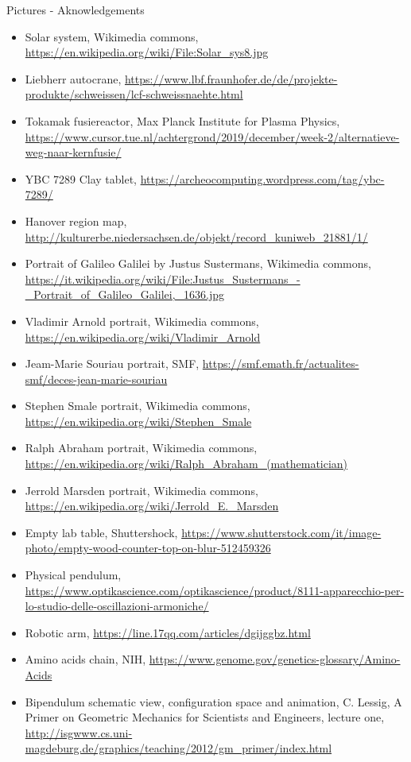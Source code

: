 \documentclass[beamer,10pt]{standalone}
\begin{document}
\begin{frame}[t,allowframebreaks]{Pictures - Aknowledgements}
	\begin{itemize}
		
		\item Solar system, Wikimedia commons,
			\url{https://en.wikipedia.org/wiki/File:Solar_sys8.jpg}
		\item Liebherr autocrane,
			\url{https://www.lbf.fraunhofer.de/de/projekte-produkte/schweissen/lcf-schweissnaehte.html}
		\item Tokamak fusiereactor, Max Planck Institute for Plasma Physics,
			\url{https://www.cursor.tue.nl/achtergrond/2019/december/week-2/alternatieve-weg-naar-kernfusie/} 	
	
		\item YBC 7289 Clay tablet, 
			\url{https://archeocomputing.wordpress.com/tag/ybc-7289/}
		\item Hanover region map,
			\url{http://kulturerbe.niedersachsen.de/objekt/record_kuniweb_21881/1/}
		\item Portrait of Galileo Galilei by Justus Sustermans, Wikimedia commons,
			\url{https://it.wikipedia.org/wiki/File:Justus_Sustermans_-_Portrait_of_Galileo_Galilei,_1636.jpg}
		\item Vladimir Arnold portrait, Wikimedia commons,
			\url{https://en.wikipedia.org/wiki/Vladimir_Arnold}
		\item Jeam-Marie Souriau portrait, SMF, 
			\url{https://smf.emath.fr/actualites-smf/deces-jean-marie-souriau}
		\item Stephen Smale portrait, Wikimedia commons,
			\url{https://en.wikipedia.org/wiki/Stephen_Smale}
		\item Ralph Abraham portrait, Wikimedia commons, 
			\url{https://en.wikipedia.org/wiki/Ralph_Abraham_(mathematician)}
		\item Jerrold Marsden portrait, Wikimedia commons,
			\url{https://en.wikipedia.org/wiki/Jerrold_E._Marsden}
	
		\item Empty lab table, Shuttershock,
			\url{https://www.shutterstock.com/it/image-photo/empty-wood-counter-top-on-blur-512459326}
		\item Physical pendulum,
			\url{https://www.optikascience.com/optikascience/product/8111-apparecchio-per-lo-studio-delle-oscillazioni-armoniche/}
		\item Robotic arm,
			\url{https://line.17qq.com/articles/dgijggbz.html}
		\item Amino acids chain, NIH, 
			\url{https://www.genome.gov/genetics-glossary/Amino-Acids}
		\item Bipendulum schematic view, configuration space and animation, C. Lessig, A Primer on Geometric Mechanics for Scientists and Engineers, lecture one, 
			\url{http://isgwww.cs.uni-magdeburg.de/graphics/teaching/2012/gm_primer/index.html}
		

\end{itemize}
\end{frame}
\end{document}
